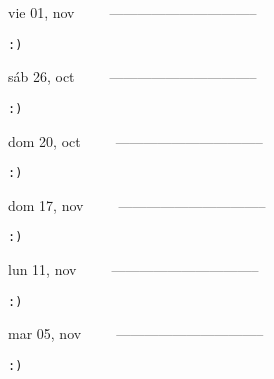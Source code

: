 \documentclass[letterpaper,10pt]{article}
\begin{document}
\begin{multicols}{3}
{vie 01, nov\ \ \ \ \ --------------------------------}
\begin{flushright}\begin{small}\texttt{:)}\end{small}\end{flushright}
\vfill
{sáb 26, oct\ \ \ \ \ --------------------------------}
\begin{flushright}\begin{small}\texttt{:)}\end{small}\end{flushright}\par
\vfill
{dom 20, oct\ \ \ \ \ --------------------------------}
\begin{flushright}\begin{small}\texttt{:)}\end{small}\end{flushright}\par
\vfill
\end{multicols}
\vspace{1.05cm}

\begin{multicols}{3}
{dom 17, nov\ \ \ \ \ --------------------------------}
\begin{flushright}\begin{small}\texttt{:)}\end{small}\end{flushright}
\vfill
{lun 11, nov\ \ \ \ \ --------------------------------}
\begin{flushright}\begin{small}\texttt{:)}\end{small}\end{flushright}\par
\vfill
{mar 05, nov\ \ \ \ \ --------------------------------}
\begin{flushright}\begin{small}\texttt{:)}\end{small}\end{flushright}\par
\vfill
\end{multicols}
\vspace{1.05cm}
\end{document}
